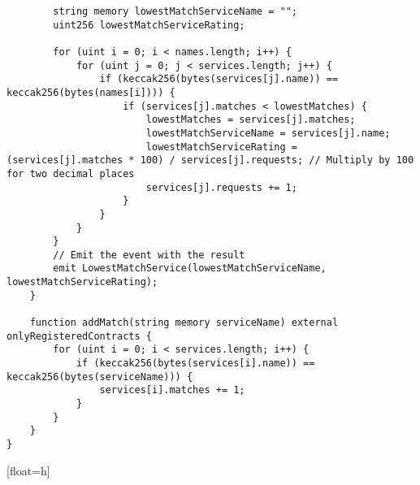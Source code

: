 \begin{lstlisting}
        string memory lowestMatchServiceName = "";
        uint256 lowestMatchServiceRating;

        for (uint i = 0; i < names.length; i++) {
            for (uint j = 0; j < services.length; j++) {
                if (keccak256(bytes(services[j].name)) == keccak256(bytes(names[i]))) {
                    if (services[j].matches < lowestMatches) {
                        lowestMatches = services[j].matches;
                        lowestMatchServiceName = services[j].name;
                        lowestMatchServiceRating = (services[j].matches * 100) / services[j].requests; // Multiply by 100 for two decimal places
                        services[j].requests += 1;
                    }
                }
            }
        }
        // Emit the event with the result
        emit LowestMatchService(lowestMatchServiceName, lowestMatchServiceRating);
    }

    function addMatch(string memory serviceName) external onlyRegisteredContracts {
        for (uint i = 0; i < services.length; i++) {
            if (keccak256(bytes(services[i].name)) == keccak256(bytes(serviceName))) {
                services[i].matches += 1;
            }
        }
    }
}
\end{lstlisting}[float=h]



\lstset{
  basicstyle=\footnotesize\ttfamily,
  breaklines=true,
  numbers=left,
  firstnumber=1,
}


